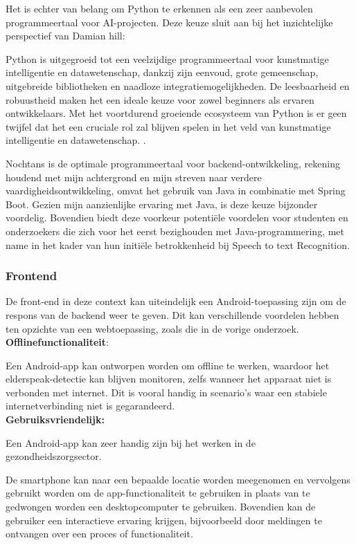 Het is echter van belang om Python te erkennen als een zeer aanbevolen programmeertaal voor AI-projecten. Deze keuze sluit aan bij het inzichtelijke perspectief van Damian hill:

Python is uitgegroeid tot een veelzijdige programmeertaal voor kunstmatige intelligentie en datawetenschap, dankzij zijn eenvoud, grote gemeenschap, uitgebreide bibliotheken en naadloze integratiemogelijkheden. De leesbaarheid en robuustheid maken het een ideale keuze voor zowel beginners als ervaren ontwikkelaars. Met het voortdurend groeiende ecosysteem van Python is er geen twijfel dat het een cruciale rol zal blijven spelen in het veld van kunstmatige intelligentie en datawetenschap. \autocite{Hill2023}.

Nochtans is de optimale programmeertaal voor backend-ontwikkeling, rekening houdend met mijn achtergrond en mijn streven naar verdere vaardigheidsontwikkeling, omvat het gebruik van Java in combinatie met Spring Boot. Gezien mijn aanzienlijke ervaring met Java, is deze keuze bijzonder voordelig. Bovendien biedt deze voorkeur potentiële voordelen voor studenten en onderzoekers die zich voor het eerst bezighouden met Java-programmering, met name in het kader van hun initiële betrokkenheid bij Speech to text Recognition.

\subsubsection{Frontend}
De front-end in deze context kan uiteindelijk een Android-toepassing zijn om de respons van de backend weer te geven. Dit kan verschillende voordelen hebben ten opzichte van een webtoepassing, zoals die in de vorige onderzoek.\\
\textbf{Offlinefunctionaliteit}:

Een Android-app kan ontworpen worden om offline te werken, waardoor het elderspeak-detectie kan blijven monitoren, zelfs wanneer het apparaat niet is verbonden met internet. Dit is vooral handig in scenario's waar een stabiele internetverbinding niet is gegarandeerd.\\
\textbf{Gebruiksvriendelijk:}

Een Android-app kan zeer handig zijn bij het werken in de gezondheidszorgsector.

De smartphone kan naar een bepaalde locatie worden meegenomen en vervolgens gebruikt worden om de app-functionaliteit te gebruiken in plaats van te gedwongen worden een desktopcomputer te gebruiken. Bovendien kan de gebruiker een interactieve ervaring krijgen, bijvoorbeeld door meldingen te ontvangen over een proces of functionaliteit.
